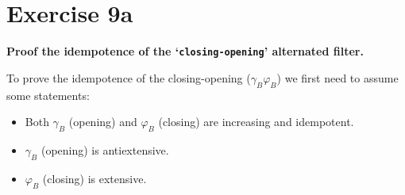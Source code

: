 \documentclass[12pt]{article}
\begin{document}
\clearpage

\section{Exercise 9a}

{
\bfseries 
Proof the idempotence of the `\texttt{closing-opening}' alternated filter.
} 

To prove the idempotence of the closing-opening ($\gamma_B\varphi_B$) we first need to assume some statements:
\begin{itemize}
    \item Both $\gamma_B$ (opening) and $\varphi_B$ (closing) are increasing and idempotent.
    \item $\gamma_B$ (opening) is antiextensive.
    \item $\varphi_B$ (closing) is extensive.
\end{itemize}

\newtheorem{thm}{Theorem}

\phantom{a}
\end{document}

